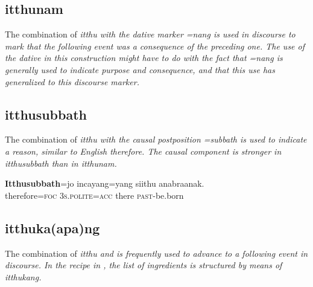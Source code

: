 \subsection{itthunam}\label{sec:wofo:itthunam}

The combination of \em itthu \em with the dative marker \em =nang \em is used in discourse to mark that the following event was a consequence of the preceding one. The use of the dative in this construction might have to do with the fact that \em =nang \em is generally used to indicate purpose  and consequence, and that this use has generalized to this discourse marker.
 


\subsection{itthusubbath}\label{sec:wofo:itthusubbath}
The combination of \em itthu \em with the causal postposition \em =subbath \em is used to indicate a reason, similar to English \em therefore\em. The causal component is stronger in \em itthusubbath \em than in \em itthunam\em.

\ea
\gll   \textbf{Itthusubbath}=jo incayang=yang    siithu anabraanak. \\
  therefore=\textsc{foc} \textsc{3s.polite}=\textsc{acc} there \textsc{past}-be.born   \\
\z


\subsection{itthuka(apa)ng}\label{sec:wofo:itthuka(apa)ng}

The combination of \em itthu \em and  is frequently used to advance to a following event in discourse. In the recipe in , the list of ingredients is structured by means of \em itthukang\em.
 
